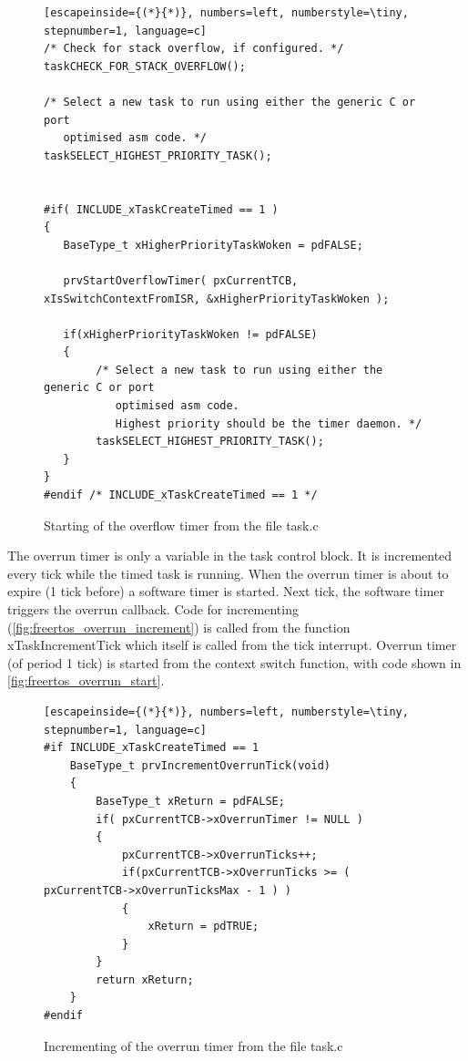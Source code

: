 \begin{figure}[H]
\begin{changemargin}{1cm}{1cm}
\begin{lstlisting}[escapeinside={(*}{*)}, numbers=left, numberstyle=\tiny, stepnumber=1, language=c]
/* Check for stack overflow, if configured. */
taskCHECK_FOR_STACK_OVERFLOW();

/* Select a new task to run using either the generic C or port
   optimised asm code. */
taskSELECT_HIGHEST_PRIORITY_TASK();


#if( INCLUDE_xTaskCreateTimed == 1 )
{
   BaseType_t xHigherPriorityTaskWoken = pdFALSE;

   prvStartOverflowTimer( pxCurrentTCB, xIsSwitchContextFromISR, &xHigherPriorityTaskWoken );

   if(xHigherPriorityTaskWoken != pdFALSE)
   {
        /* Select a new task to run using either the generic C or port
           optimised asm code.
           Highest priority should be the timer daemon. */
        taskSELECT_HIGHEST_PRIORITY_TASK();
   }
}
#endif /* INCLUDE_xTaskCreateTimed == 1 */
\end{lstlisting}  
\end{changemargin}
\caption{Starting of the overflow timer from the file task.c}
\label{fig:freertos_overflow_start}
\end{figure}

The overrun timer is only a variable in the task control block. It is incremented every tick while the timed task is running. When the overrun timer is about to expire (1 tick before) a software timer is started. Next tick, the software timer triggers the overrun callback. Code for incrementing (\autoref{fig:freertos_overrun_increment}) is called from the function xTaskIncrementTick which itself is called from the tick interrupt. Overrun timer (of period 1 tick) is started from the context switch function, with code shown in \autoref{fig:freertos_overrun_start}.

\begin{figure}[H]
\begin{changemargin}{1cm}{1cm}
\begin{lstlisting}[escapeinside={(*}{*)}, numbers=left, numberstyle=\tiny, stepnumber=1, language=c]
#if INCLUDE_xTaskCreateTimed == 1
    BaseType_t prvIncrementOverrunTick(void)
    {
        BaseType_t xReturn = pdFALSE;
        if( pxCurrentTCB->xOverrunTimer != NULL )
        {
            pxCurrentTCB->xOverrunTicks++;
            if(pxCurrentTCB->xOverrunTicks >= ( pxCurrentTCB->xOverrunTicksMax - 1 ) )
            {
                xReturn = pdTRUE;
            }
        }
        return xReturn;
    }
#endif
\end{lstlisting}  
\end{changemargin}

\caption{Incrementing of the overrun timer from the file task.c}
\label{fig:freertos_overrun_increment}
    
\end{figure}

